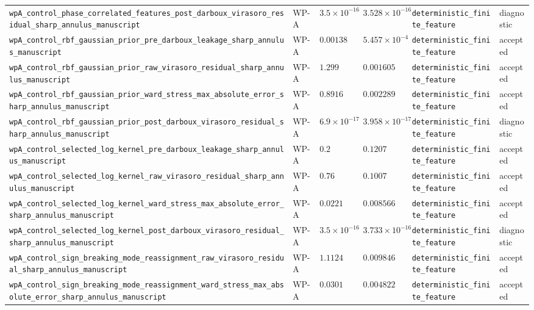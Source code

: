 \begin{table}[t]
\begin{tabular}{@{}llllll@{}}
\texttt{wpA\_control\_phase\_correlated\_features\_post\_darboux\_virasoro\_residual\_sharp\_annulus\_manuscript} & WP-A & $3.5\times10^{-16}$ & $3.528\times10^{-16}$ & \texttt{deterministic\_finite\_feature} & diagnostic \\
\texttt{wpA\_control\_rbf\_gaussian\_prior\_pre\_darboux\_leakage\_sharp\_annulus\_manuscript} & WP-A & $0.00138$ & $5.457\times10^{-4}$ & \texttt{deterministic\_finite\_feature} & accepted \\
\texttt{wpA\_control\_rbf\_gaussian\_prior\_raw\_virasoro\_residual\_sharp\_annulus\_manuscript} & WP-A & $1.299$ & $0.001605$ & \texttt{deterministic\_finite\_feature} & accepted \\
\texttt{wpA\_control\_rbf\_gaussian\_prior\_ward\_stress\_max\_absolute\_error\_sharp\_annulus\_manuscript} & WP-A & $0.8916$ & $0.002289$ & \texttt{deterministic\_finite\_feature} & accepted \\
\texttt{wpA\_control\_rbf\_gaussian\_prior\_post\_darboux\_virasoro\_residual\_sharp\_annulus\_manuscript} & WP-A & $6.9\times10^{-17}$ & $3.958\times10^{-17}$ & \texttt{deterministic\_finite\_feature} & diagnostic \\
\texttt{wpA\_control\_selected\_log\_kernel\_pre\_darboux\_leakage\_sharp\_annulus\_manuscript} & WP-A & $0.2$ & $0.1207$ & \texttt{deterministic\_finite\_feature} & accepted \\
\texttt{wpA\_control\_selected\_log\_kernel\_raw\_virasoro\_residual\_sharp\_annulus\_manuscript} & WP-A & $0.76$ & $0.1007$ & \texttt{deterministic\_finite\_feature} & accepted \\
\texttt{wpA\_control\_selected\_log\_kernel\_ward\_stress\_max\_absolute\_error\_sharp\_annulus\_manuscript} & WP-A & $0.0221$ & $0.008566$ & \texttt{deterministic\_finite\_feature} & accepted \\
\texttt{wpA\_control\_selected\_log\_kernel\_post\_darboux\_virasoro\_residual\_sharp\_annulus\_manuscript} & WP-A & $3.5\times10^{-16}$ & $3.733\times10^{-16}$ & \texttt{deterministic\_finite\_feature} & diagnostic \\
\texttt{wpA\_control\_sign\_breaking\_mode\_reassignment\_raw\_virasoro\_residual\_sharp\_annulus\_manuscript} & WP-A & $1.1124$ & $0.009846$ & \texttt{deterministic\_finite\_feature} & accepted \\
\texttt{wpA\_control\_sign\_breaking\_mode\_reassignment\_ward\_stress\_max\_absolute\_error\_sharp\_annulus\_manuscript} & WP-A & $0.0301$ & $0.004822$ & \texttt{deterministic\_finite\_feature} & accepted \\

\end{tabular}
\end{table}
